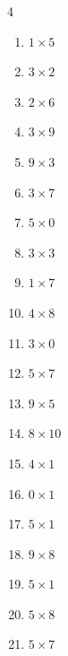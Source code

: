 \begin{multicols}{4}
\begin{enumerate}
  \item $1\times 5$
        \phantom{$=5$}

  \item $3\times 2$
        \phantom{$=6$}

  \item $2\times 6$
        \phantom{$=12$}

  \item $3\times 9$
        \phantom{$=27$}

  \item $9\times 3$
        \phantom{$=27$}

  \item $3\times 7$
        \phantom{$=21$}

  \item $5\times 0$
        \phantom{$=0$}

  \item $3\times 3$
        \phantom{$=9$}

  \item $1\times 7$
        \phantom{$=7$}

  \item $4\times 8$
        \phantom{$=32$}

\columnbreak %

  \item $3\times 0$
        \phantom{$=0$}

  \item $5\times 7$
        \phantom{$=35$}

  \item $9\times 5$
        \phantom{$=45$}

  \item $8\times 10$
        \phantom{$=80$}

  \item $4\times 1$
        \phantom{$=4$}

  \item $0\times 1$
        \phantom{$=0$}

  \item $5\times 1$
        \phantom{$=5$}

  \item $9\times 8$
        \phantom{$=72$}

  \item $5\times 1$
        \phantom{$=5$}

  \item $5\times 8$
        \phantom{$=40$}

  \item $5\times 7$
        \phantom{$=35$}


\end{enumerate}
\end{multicols}
